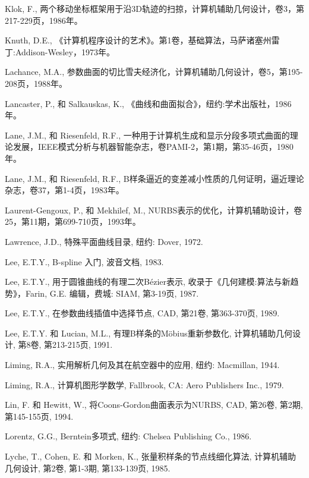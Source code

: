 \documentclass[../main.tex]{subfiles}
\begin{document}
\begin{BookBibliography}
 Klok, F., 两个移动坐标框架用于沿3D轨迹的扫掠，计算机辅助几何设计，卷3，第217-229页，1986年。

 Knuth, D.E., 《计算机程序设计的艺术》。第1卷，基础算法，马萨诸塞州雷丁:Addison-Wesley，1973年。

 Lachance, M.A., 参数曲面的切比雪夫经济化，计算机辅助几何设计，卷5，第195-208页，1988年。

 Lancaster, P., 和 Salkauskas, K., 《曲线和曲面拟合》，纽约:学术出版社，1986年。

 Lane, J.M., 和 Riesenfeld, R.F., 一种用于计算机生成和显示分段多项式曲面的理论发展，IEEE模式分析与机器智能杂志，卷PAMI-2，第1期，第35-46页，1980年。

 Lane, J.M., 和 Riesenfeld, R.F., B样条逼近的变差减小性质的几何证明，逼近理论杂志，卷37，第1-4页，1983年。

 Laurent-Gengoux, P., 和 Mekhilef, M., NURBS表示的优化，计算机辅助设计，卷25，第11期，第699-710页，1993年。

 Lawrence, J.D., 特殊平面曲线目录, 纽约: Dover, 1972.

 Lee, E.T.Y., B-spline 入门, 波音文档, 1983.

 Lee, E.T.Y., 用于圆锥曲线的有理二次Bézier表示, 收录于《几何建模:算法与新趋势》，Farin, G.E. 编辑，费城: SIAM, 第3-19页, 1987.

 Lee, E.T.Y., 在参数曲线插值中选择节点, CAD, 第21卷, 第363-370页, 1989.

 Lee, E.T.Y. 和 Lucian, M.L., 有理B样条的Möbius重新参数化, 计算机辅助几何设计, 第8卷, 第213-215页, 1991.

 Liming, R.A., 实用解析几何及其在航空器中的应用, 纽约: Macmillan, 1944.

 Liming, R.A., 计算机图形学数学, Fallbrook, CA: Aero Publishers Inc., 1979.

 Lin, F. 和 Hewitt, W., 将Coons-Gordon曲面表示为NURBS, CAD, 第26卷, 第2期, 第145-155页, 1994.

 Lorentz, G.G., Berntein多项式, 纽约: Chelsea Publishing Co., 1986.

 Lyche, T., Cohen, E. 和 Morken, K., 张量积样条的节点线细化算法, 计算机辅助几何设计, 第2卷, 第1-3期, 第133-139页, 1985.


\end{BookBibliography}
\end{document}
